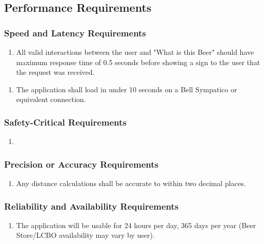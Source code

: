 \documentclass[]{article}
\begin{document}

\subsection{Performance Requirements}
\label{sub:performance_requirements}

\subsubsection{Speed and Latency Requirements}
\label{ssub:speed_and_latency_requirements}
\begin{enumerate}[{PR}1. ]
	\item All valid interactions between the user and "What is this Beer" should have maximum response time of 0.5 seconds before showing a sign to the user that the request was received.
\end{enumerate}
\begin{enumerate}[{PR}2. ]
	\item The application shall load in under 10 seconds on a Bell Sympatico or equivalent connection.
\end{enumerate}

\subsubsection{Safety-Critical Requirements}
\label{ssub:safety_critical_requirements}
\begin{enumerate}[{PR}1. ]
	\item 
\end{enumerate}

\subsubsection{Precision or Accuracy Requirements}
\label{ssub:precision_or_accuracy_requirements}
\begin{enumerate}[{PR}1. ]
	\item Any distance calculations shall be accurate to within two decimal places.
\end{enumerate}

\subsubsection{Reliability and Availability Requirements}
\label{ssub:reliability_and_availability_requirements}
\begin{enumerate}[{PR}1. ]
	\item The application will be usable for 24 hours per day, 365 days per year (Beer Store/LCBO availability may vary by user).
\end{enumerate}
\end{document}
